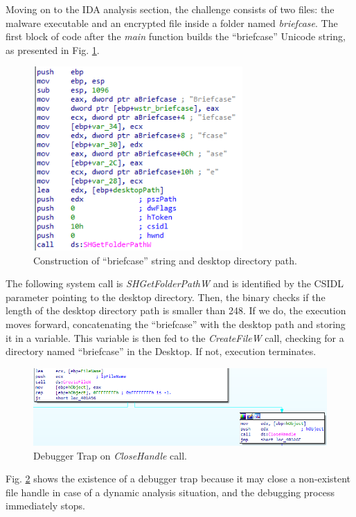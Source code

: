Moving on to the IDA analysis section, the challenge consists of two files: the malware executable and an encrypted file inside a folder named \textit{briefcase}. The first block of code after the \textit{main} function builds the ``briefcase'' Unicode string, as presented in Fig. \ref{fig:ida_1}. 

\begin{figure}[H]
    \includegraphics[width=8cm]{figures/ida_1.png}
    \caption{Construction of ``briefcase'' string and desktop directory path.}
    \label{fig:ida_1}
\end{figure}

The following system call is \textit{SHGetFolderPathW} and is identified by the CSIDL parameter pointing to the desktop directory. Then, the binary checks if the length of the desktop directory path is smaller than 248. If we do, the execution moves forward, concatenating the ``briefcase'' with the desktop path and storing it in a variable. This variable is then fed to the \textit{CreateFileW} call, checking for a directory named ``briefcase'' in the Desktop. If not, execution terminates. 

\begin{figure}[H]
    \includegraphics[width=12cm]{figures/ida_2.png}
    \caption{Debugger Trap on \textit{CloseHandle} call.}
    \label{fig:ida_2}
\end{figure}

Fig. \ref{fig:ida_2} shows the existence of a debugger trap because it may close a non-existent file handle in case of a dynamic analysis situation, and the debugging process immediately stops.

